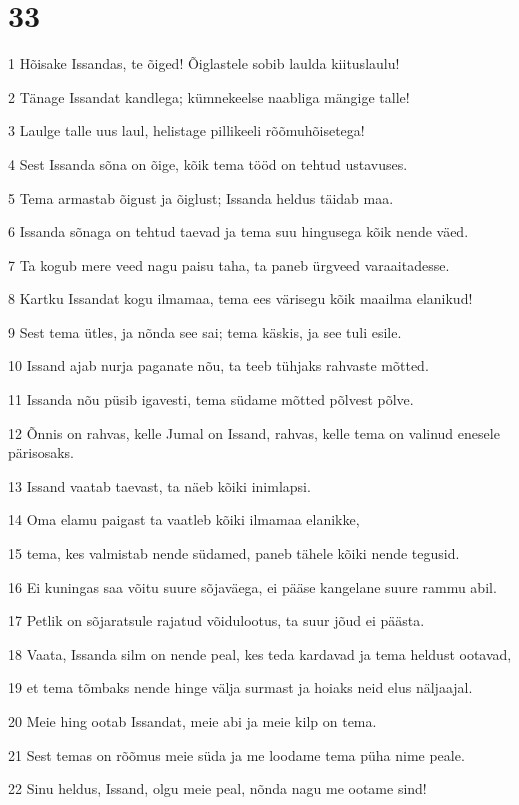 \chapter{33}

\par 1 Hõisake Issandas, te õiged! Õiglastele sobib laulda kiituslaulu!
\par 2 Tänage Issandat kandlega; kümnekeelse naabliga mängige talle!
\par 3 Laulge talle uus laul, helistage pillikeeli rõõmuhõisetega!
\par 4 Sest Issanda sõna on õige, kõik tema tööd on tehtud ustavuses.
\par 5 Tema armastab õigust ja õiglust; Issanda heldus täidab maa.
\par 6 Issanda sõnaga on tehtud taevad ja tema suu hingusega kõik nende väed.
\par 7 Ta kogub mere veed nagu paisu taha, ta paneb ürgveed varaaitadesse.
\par 8 Kartku Issandat kogu ilmamaa, tema ees värisegu kõik maailma elanikud!
\par 9 Sest tema ütles, ja nõnda see sai; tema käskis, ja see tuli esile.
\par 10 Issand ajab nurja paganate nõu, ta teeb tühjaks rahvaste mõtted.
\par 11 Issanda nõu püsib igavesti, tema südame mõtted põlvest põlve.
\par 12 Õnnis on rahvas, kelle Jumal on Issand, rahvas, kelle tema on valinud enesele pärisosaks.
\par 13 Issand vaatab taevast, ta näeb kõiki inimlapsi.
\par 14 Oma elamu paigast ta vaatleb kõiki ilmamaa elanikke,
\par 15 tema, kes valmistab nende südamed, paneb tähele kõiki nende tegusid.
\par 16 Ei kuningas saa võitu suure sõjaväega, ei pääse kangelane suure rammu abil.
\par 17 Petlik on sõjaratsule rajatud võidulootus, ta suur jõud ei päästa.
\par 18 Vaata, Issanda silm on nende peal, kes teda kardavad ja tema heldust ootavad,
\par 19 et tema tõmbaks nende hinge välja surmast ja hoiaks neid elus näljaajal.
\par 20 Meie hing ootab Issandat, meie abi ja meie kilp on tema.
\par 21 Sest temas on rõõmus meie süda ja me loodame tema püha nime peale.
\par 22 Sinu heldus, Issand, olgu meie peal, nõnda nagu me ootame sind!

